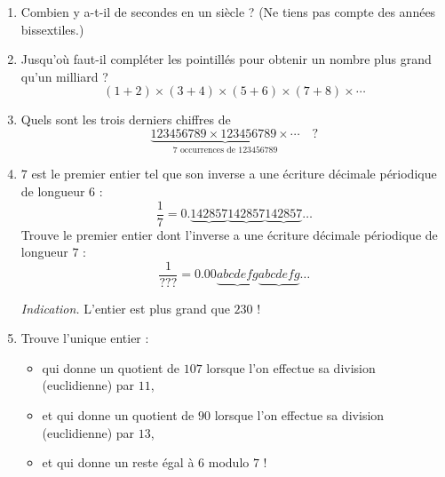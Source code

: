 \documentclass[11pt,class=report,crop=false]{standalone}
\begin{document}

\begin{activite}


\begin{enumerate}
  \item Combien y a-t-il de secondes en un siècle ? (Ne tiens pas compte des années bissextiles.)
  
  \item Jusqu'où faut-il compléter les pointillés pour obtenir un nombre plus grand qu'un milliard ?
  $$(1+2)\times(3+4)\times(5+6)\times(7+8)\times\cdots$$
  
  \item Quels sont les trois derniers chiffres de 
  $$\underbrace{123456789 \times 123456789 \times \cdots}_{7 \text{ occurrences de } 123456789} \quad ?$$
  
  \item $7$ est le premier entier tel que son inverse a une écriture décimale périodique de longueur $6$ :
  $$\frac{1}{7} = 0.\underbrace{142857}\underbrace{142857}\underbrace{142857}\ldots$$ Trouve le premier entier dont l'inverse a une écriture décimale périodique de longueur $7$ :
  $$\frac{1}{???} = 0.00\underbrace{abcdefg}\underbrace{abcdefg}\ldots$$
  
  \emph{Indication.} L'entier est plus grand que $230$ !
  
  \item Trouve l'unique entier :
  \begin{itemize}
    \item qui donne un quotient de $107$ lorsque l'on effectue sa division (euclidienne) par $11$,
    \item et qui donne un quotient de $90$ lorsque l'on effectue sa division (euclidienne) par $13$,
    \item et qui donne un reste égal à $6$ modulo $7$ !
  \end{itemize}
    
\end{enumerate}

\end{activite}

\end{document}
